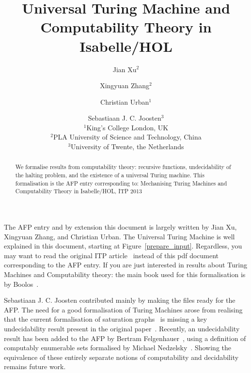 \documentclass{article}
\def\inst#1{\unskip$^{#1}$}
\begin{document}
\title{Universal Turing Machine and Computability Theory in Isabelle/HOL}
\author{Jian Xu\inst{2} \and Xingyuan Zhang\inst{2} \and Christian Urban\inst{1} \and Sebastiaan J. C. Joosten\inst{3} \vspace{3pt} \\
\inst{1}King's College London, UK \\ \inst{2}PLA University of Science and Technology, China \\ \inst{3}University of Twente, the Netherlands}

\maketitle


\begin{abstract}
We formalise results from computability theory: recursive functions, undecidability of the halting problem, and the existence of a universal Turing machine. 
This formalisation is the AFP entry corresponding to: Mechanising Turing Machines and Computability Theory in Isabelle/HOL, ITP 2013
\end{abstract}

The AFP entry and by extension this document is largely written by Jian Xu, Xingyuan Zhang, and Christian Urban.
The Universal Turing Machine is well explained in this document, starting at Figure~\ref{prepare_input}.
Regardless, you may want to read the original ITP article~\cite{Xu13} instead of this pdf document corresponding to the AFP entry.
If you are just interested in results about Turing Machines and Computability theory: the main book used for this formalisation is by Boolos~\cite{Boolos87}.

Sebastiaan J. C. Joosten contributed mainly by making the files ready for the AFP.
The need for a good formalisation of Turing Machines arose from realising that the current formalisation of saturation graphs~\cite{Graph_Saturation-AFP} is missing a key undecidability result present in the original paper~\cite{Joosten18}.
Recently, an undecidability result has been added to the AFP by Bertram Felgenhauer~\cite{Minsky_Machines-AFP}, using a definition of computably enumerable sets formalised by Michael Nedzelsky~\cite{Recursion-Theory-I-AFP}.
Showing the equivalence of these entirely separate notions of computability and decidability remains future work.





\end{document}
